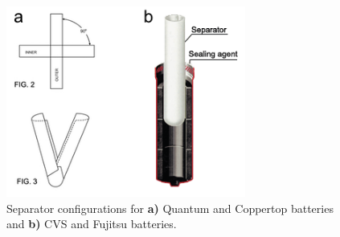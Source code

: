 \begin{figure}[htb]
  \centering
    \includegraphics[width=0.7\textwidth]{ch5-alkbw/images/SepAssembly.png}
    \caption[Two separator configurations in alkaline AA batteries.]{Separator configurations for \textbf{a)} Quantum and Coppertop batteries and \textbf{b)} CVS and Fujitsu batteries.}
    \label{fig:sepassembly}
\end{figure}






